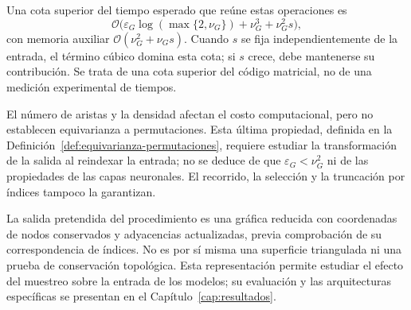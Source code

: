 Una cota superior del tiempo esperado que reúne estas operaciones es
\[
\mathcal O\bigl(\varepsilon_G\log(\max\{2,\nu_G\})+\nu_G^3+\nu_G^2s\bigr),
\]
con memoria auxiliar $\mathcal O(\nu_G^2+\nu_Gs)$. Cuando $s$ se fija independientemente de la entrada, el término cúbico domina esta cota; si $s$ crece, debe mantenerse su contribución. Se trata de una cota superior del código matricial, no de una medición experimental de tiempos.

El número de aristas y la densidad afectan el costo computacional, pero no establecen equivarianza a permutaciones. Esta última propiedad, definida en la Definición~\ref{def:equivarianza-permutaciones}, requiere estudiar la transformación de la salida al reindexar la entrada; no se deduce de que $\varepsilon_G<\nu_G^2$ ni de las propiedades de las capas neuronales. El recorrido, la selección y la truncación por índices tampoco la garantizan.

La salida pretendida del procedimiento es una gráfica reducida con coordenadas de nodos conservados y adyacencias actualizadas, previa comprobación de su correspondencia de índices. No es por sí misma una superficie triangulada ni una prueba de conservación topológica. Esta representación permite estudiar el efecto del muestreo sobre la entrada de los modelos; su evaluación y las arquitecturas específicas se presentan en el Capítulo~\ref{cap:resultados}.
